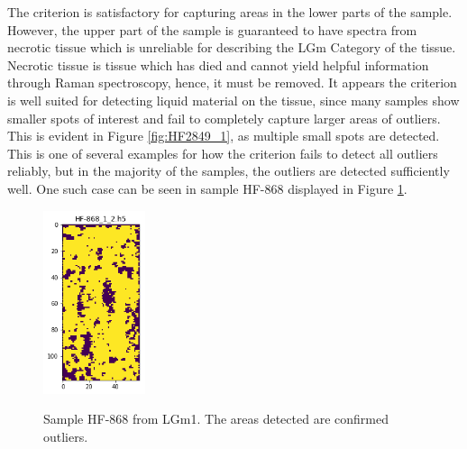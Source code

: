 The criterion is satisfactory for capturing areas in the lower parts of the sample. However, the upper part of the sample is guaranteed to have spectra from necrotic tissue which is unreliable for describing the LGm Category of the tissue. Necrotic tissue is tissue which has died and cannot yield helpful information through Raman spectroscopy, hence, it must be removed. It appears the criterion is well suited for detecting liquid material on the tissue, since many samples show smaller spots of interest and fail to completely capture larger areas of outliers. This is evident in Figure \ref{fig:HF2849_1}, as multiple small spots are detected. This is one of several examples for how the criterion fails to detect all outliers reliably, but in the majority of the samples, the outliers are detected sufficiently well. One such case can be seen in sample HF-868 displayed in Figure \ref{fig:ADHF868}.

\begin{figure}[H]

    \centering
{\includegraphics[width=3cm]{images/AdriansCriterion/LGm-1/HF-868_1_2.h5_0.png} }
\caption{Sample HF-868 from LGm1. The areas detected are confirmed outliers.\label{fig:ADHF868}}%

\end{figure}

